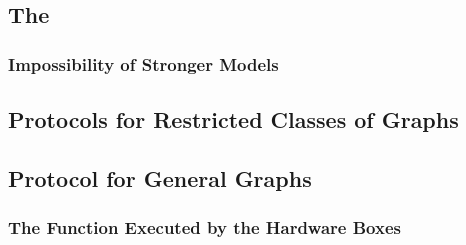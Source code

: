 \subsection{The \delayModel}\label{sec:thcmodel}


\subsubsection{Impossibility of Stronger Models}\label{sec:impossible}


\subsection{Protocols for Restricted Classes of Graphs}\label{sec:prcg}

%
%

\subsection{Protocol for General Graphs}\label{section:protGen}

\subsubsection{The Function Executed by the Hardware Boxes}\label{app-06-hw-function}


